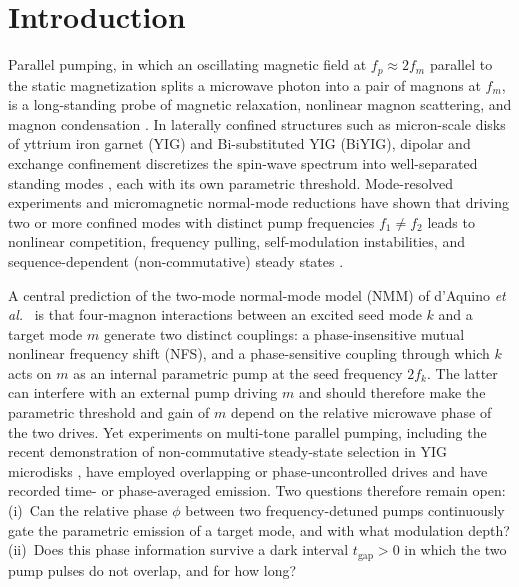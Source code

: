 \documentclass[aps,prb,reprint,superscriptaddress,floatfix]{revtex4-2}
\newcommand{\tgap}{t_{\mathrm{gap}}}
\begin{document}
\section{Introduction}\label{sec:intro}

Parallel pumping, in which an oscillating magnetic field at $f_p\approx 2f_m$ parallel to the static magnetization splits a microwave photon into a pair of magnons at $f_m$, is a long-standing probe of magnetic relaxation, nonlinear magnon scattering, and magnon condensation \cite{suhl57,gurevich96,bracher17}. In laterally confined structures such as micron-scale disks of yttrium iron garnet (YIG) and Bi-substituted YIG (BiYIG), dipolar and exchange confinement discretizes the spin-wave spectrum into well-separated standing modes \cite{daquino09,srivastava23,abert19}, each with its own parametric threshold. Mode-resolved experiments and micromagnetic normal-mode reductions \cite{srivastava23,massouras24,perna22} have shown that driving two or more confined modes with distinct pump frequencies $f_1\neq f_2$ leads to nonlinear competition, frequency pulling, self-modulation instabilities, and sequence-dependent (non-commutative) steady states \cite{daquino26,soares26,yemeli25,kim24}.

A central prediction of the two-mode normal-mode model (NMM) of d'Aquino \textit{et al.}\ \cite{daquino26} is that four-magnon interactions between an excited seed mode $k$ and a target mode $m$ generate two distinct couplings: a phase-insensitive mutual nonlinear frequency shift (NFS), and a phase-sensitive coupling through which $k$ acts on $m$ as an internal parametric pump at the seed frequency $2f_k$. The latter can interfere with an external pump driving $m$ and should therefore make the parametric threshold and gain of $m$ depend on the relative microwave phase of the two drives. Yet experiments on multi-tone parallel pumping, including the recent demonstration of non-commutative steady-state selection in YIG microdisks \cite{soares26}, have employed overlapping or phase-uncontrolled drives and have recorded time- or phase-averaged emission. Two questions therefore remain open: (i)~Can the relative phase $\phi$ between two frequency-detuned pumps continuously gate the parametric emission of a target mode, and with what modulation depth? (ii)~Does this phase information survive a dark interval $\tgap>0$ in which the two pump pulses do not overlap, and for how long?
\end{document}

